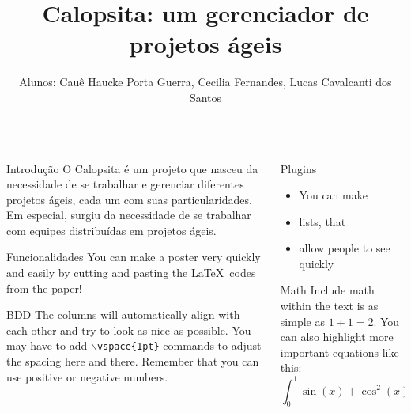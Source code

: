 \documentclass[serif,mathserif,final]{beamer}
\title{Calopsita: um gerenciador de projetos ágeis}
\author{Alunos: Cauê Haucke Porta Guerra, Cecilia Fernandes, Lucas Cavalcanti dos Santos}
\newcommand{\calopsita}{Calopsita}
\begin{document}
\begin{frame}{}
  \begin{columns}[t]

    \begin{column}{0.32\linewidth}

      \begin{block}{Introdução}
        O \calopsita{} é um projeto que nasceu da necessidade de se trabalhar e gerenciar diferentes projetos ágeis, cada um com suas particularidades. Em especial, surgiu da necessidade de se trabalhar com equipes distribuídas em projetos ágeis. 
      \end{block}

      \begin{block}{Funcionalidades}
        You can make a poster very quickly and easily by cutting and pasting
        the \LaTeX~codes from the paper!
      \end{block}

      \begin{block}{BDD}
        The columns will automatically align with each other and try to look
        as nice as possible.  You may have to add {\tt$\backslash$vspace\{1pt\}}
        commands to adjust the spacing here and there.  Remember that you can
        use positive or negative numbers.
      \end{block}

    \end{column}%

    \begin{column}{0.32\linewidth}

      \begin{block}{Plugins}
        \begin{itemize}
          \item You can make
          \item lists, that
          \item allow people to see quickly
        \end{itemize}
      \end{block}

      \begin{block}{Math}
        Include math within the text is as simple as $1+1=2$.  You can also
        highlight more important equations like this:
        \begin{equation*}
          \int_0^1\sin(x)+\cos^2(x)+\alpha x~d\!x
        \end{equation*}
      \end{block}


\end{column}
\end{columns}
\end{frame}
\end{document}
